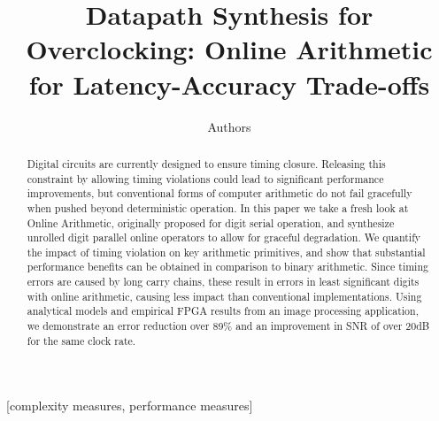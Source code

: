 \documentclass{acm_proc_article-sp}
\begin{document}
\title{Datapath Synthesis for Overclocking: Online Arithmetic for Latency-Accuracy Trade-offs}


%
\author{
\alignauthor
Authors
}

\maketitle
\begin{abstract}
Digital circuits are currently designed to ensure timing closure. Releasing this constraint by allowing timing violations could lead to significant performance improvements, but conventional forms of computer arithmetic do not fail gracefully when pushed beyond deterministic operation. In this paper we take a fresh look at Online Arithmetic, originally proposed for digit serial operation, and synthesize unrolled digit parallel online operators to allow for graceful degradation. We quantify the impact of timing violation on key arithmetic primitives, and show that substantial performance benefits can be obtained in comparison to binary arithmetic. Since timing errors are caused by long carry chains, these result in errors in least significant digits with online arithmetic, causing less impact than conventional implementations. Using analytical models and empirical FPGA results from an image processing application, we demonstrate an error reduction over 89\% and an improvement in SNR of over 20dB for the same clock rate.
\end{abstract}


[complexity measures, performance measures]

\end{document}
